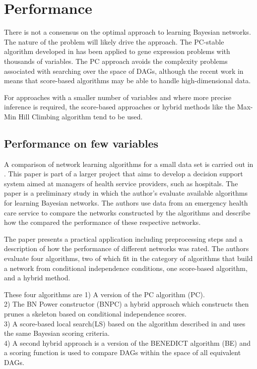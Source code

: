     \chapter{Performance}

    There is not a consensus on the optimal approach to learning
    Bayesian networks. The nature of the problem will likely
    drive the approach. The PC-stable algorithm developed in
    \cite{Colombo2014} has been applied to gene expression problems
    with thousands of variables. The PC approach avoids the 
    complexity problems associated with searching over the space
    of DAGs, although the recent work in \cite{NIPS2015_5803}
    means that score-based algorithms may be able to handle 
    high-dimensional data. 

    For approaches with a smaller number of variables and 
    where more precise inference is required, the score-based
    approaches or hybrid methods like the Max-Min Hill Climbing 
    algorithm tend to be used. 



  \section{Performance on few variables }
    
    A comparison of network 
    learning algorithms for a small data set is carried
    out in \cite{Acid2004}.
    This paper is part of a larger project that aims to develop
    a decision support system aimed at managers of 
    health service providers, such as hospitals. The paper
    is a preliminary study in which the author's evaluate
    available algorithms for learning Bayesian networks. 
    The authors use data from an emergency health care service
    to compare the networks constructed 
    by the algorithms and describe how the compared the
    performance of these respective networks. 
 

    The paper presents a practical application including
    preprocessing steps and a description of how the performance
    of different networks was rated. The authors evaluate four 
    algorithms, two of which fit in the category of algorithms
    that build a network from conditional independence conditions, 
    one score-based algorithm, and a hybrid method. 
    
    These four algorithms are 
        1) A version of the PC algorithm (PC). \\
        2) The BN Power constructor (BNPC) a hybrid approach 
        which constructs then prunes a skeleton based on 
        conditional independence scores. \\
        3) A score-based local search(LS) based on the algorithm
        described in \cite{Giovani2014}  and uses
        the same Bayesian scoring criteria.  \\
        4) A second hybrid approach is a version of the BENEDICT
        algorithm (BE) and a scoring function is used to compare
        DAGs within the space of all equivalent DAGs. \\

